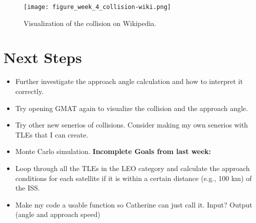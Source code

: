 \documentclass[12pt]{report}
\begin{document}
\begin{enumerate}
  \begin{figure}[H]
    \centering
    \texttt{[image: figure\_week\_4\_collision-wiki.png]}
    \caption{Visualization of the collision on Wikipedia.}
    \label{fig:collision_visualization}
  \end{figure}

\end{enumerate}

\chapter*{Next Steps}
\begin{itemize}
  \item Further investigate the approach angle calculation and how to interpret it correctly.
  \item Try opening GMAT again to visualize the collision and the approach angle.
  \item Try other new senerios of collisions. Consider making my own senerios with TLEs that I can create.
  \item Monte Carlo simulation.
  \newline\newline\newline\textbf{Incomplete Goals from last week:}
  \item Loop through all the TLEs in the LEO category and calculate the approach conditions for each satellite if it is within a certain distance (e.g., 100 km) of the ISS.
  \item Make my code a usable function so Catherine can just call it. Input? \textrightarrow{} Output (angle and approach speed)
\end{itemize}
\end{document}
